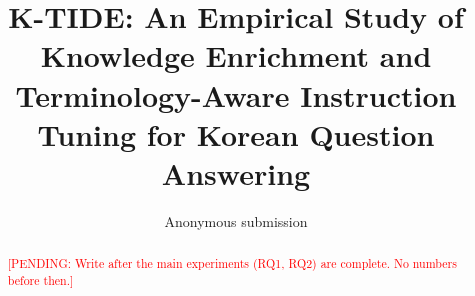 \documentclass[11pt]{article}
\title{K-TIDE: An Empirical Study of Knowledge Enrichment and\\
Terminology-Aware Instruction Tuning for Korean Question Answering}
\author{Anonymous submission}
\newcommand{\pending}[1]{\textcolor{red}{[PENDING: #1]}}
\begin{document}
\maketitle

\begin{abstract}
\pending{Write after the main experiments (RQ1, RQ2) are complete. No numbers before then.}
\end{abstract}












\appendix

\end{document}
